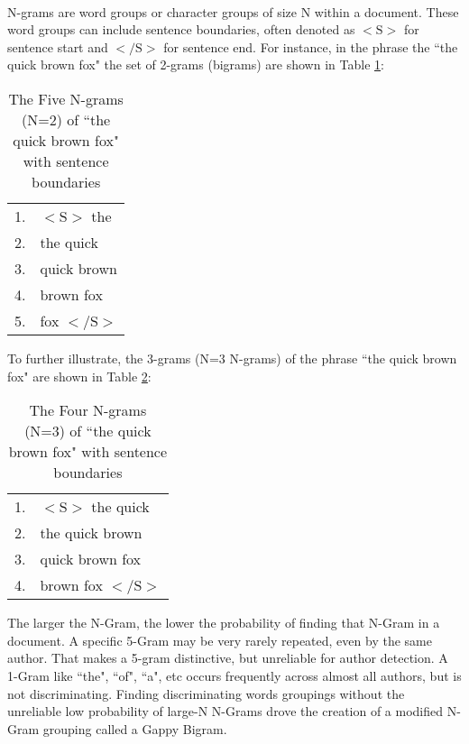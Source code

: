 		\paragraph{} N-grams are word groups or character groups of size N within a document.  These word groups can include sentence boundaries, often denoted as $<\text{S}>$ for sentence start and $<\text{/S}>$ for sentence end. For instance, in the phrase the ``the quick brown fox" the set of 2-grams (bigrams) are shown in Table \ref{table:2grams}:
		\begin{center}
			\begin{table}[h]
				\begin{center}
					\begin{tabular}{ r l}
					1. & $<\text{S}>$ the\\
					2. & the quick\\
					3. & quick brown\\
					4. & brown fox\\
					5. & fox $<\text{/S}>$\\
					\end{tabular}
					\caption{The Five N-grams (N=2) of ``the quick brown fox" with sentence boundaries}
					\label{table:2grams}
				\end{center}
			\end{table}
		\end{center}
		
		To further illustrate, the 3-grams (N=3 N-grams) of the phrase ``the quick brown fox" are shown in Table \ref{table:3grams}:
		
		\begin{center}
			\begin{table}[h]
			
			
				\begin{center}
					\begin{tabular}{ r l }
					1. & $<\text{S}>$ the quick\\
					2. & the quick brown \\
					3. & quick brown fox\\
					4. & brown fox $<\text{/S}>$\\
					\end{tabular}
					\caption{The Four N-grams (N=3) of ``the quick brown fox" with sentence boundaries}
					\label{table:3grams}
				\end{center}
			\end{table}
		\end{center}
		
		The larger the N-Gram, the lower the probability of finding that N-Gram in a document.  A specific 5-Gram may be very rarely repeated, even by the same author.  That makes a 5-gram distinctive, but unreliable for author detection.  A 1-Gram like ``the", ``of", ``a", etc occurs frequently across almost all authors, but is not discriminating.  Finding discriminating words groupings without the unreliable low probability of large-N N-Grams drove the creation of a modified N-Gram grouping called a Gappy Bigram.

